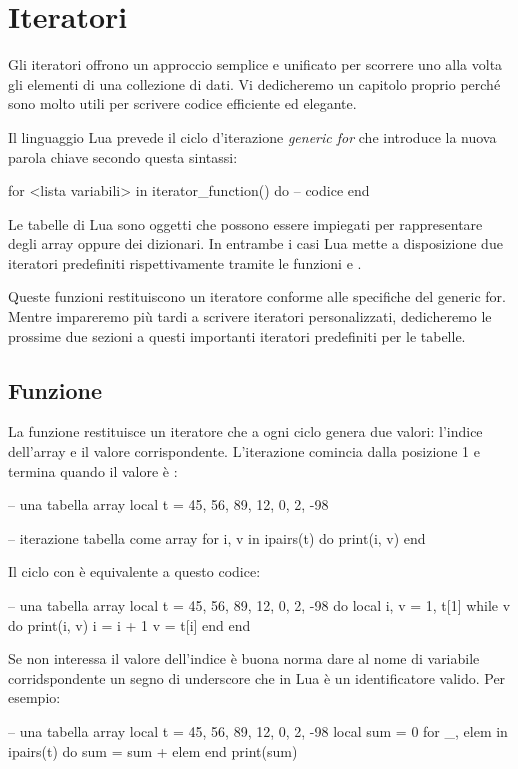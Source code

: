 
\chapter{Iteratori}

Gli iteratori offrono un approccio semplice e unificato per scorrere uno alla
volta gli elementi di una collezione di dati. Vi dedicheremo un capitolo proprio
perché sono molto utili per scrivere codice efficiente ed elegante.

Il linguaggio Lua prevede il ciclo d'iterazione \emph{generic for} che
introduce la nuova parola chiave  secondo questa sintassi:
\begin{lines}
for <lista variabili> in iterator_function() do
-- codice
end
\end{lines}

Le tabelle di Lua sono oggetti che possono essere impiegati per rappresentare
degli array oppure dei dizionari. In entrambe i casi Lua mette a disposizione
due iteratori predefiniti rispettivamente tramite le funzioni  e
.

Queste funzioni restituiscono un iteratore conforme alle specifiche del generic
for. Mentre impareremo più tardi a scrivere iteratori personalizzati,
dedicheremo le prossime due sezioni a questi importanti iteratori predefiniti
per le tabelle.


\section{Funzione }

La funzione  restituisce un iteratore che a ogni ciclo genera due
valori: l'indice dell'array e il valore corrispondente. L'iterazione comincia
dalla posizione 1 e termina quando il valore è :
\begin{lines}
-- una tabella array
local t = {45, 56, 89, 12, 0, 2, -98}

-- iterazione tabella come array
for i, v in ipairs(t) do
    print(i, v)
end
\end{lines}

Il ciclo con  è equivalente a questo codice:
\begin{lines}
-- una tabella array
local t = {45, 56, 89, 12, 0, 2, -98}
do
    local i, v = 1, t[1]
    while v do
        print(i, v)
        i = i + 1
        v = t[i]
    end
end
\end{lines}

Se non interessa il valore dell'indice è buona norma dare al nome di variabile
corridspondente un segno di underscore \key{\_} che in Lua è un identificatore
valido. Per esempio:
\begin{lines}
-- una tabella array
local t = {45, 56, 89, 12, 0, 2, -98}
local sum = 0
for _, elem in ipairs(t) do
    sum = sum + elem
end
print(sum)
\end{lines}

